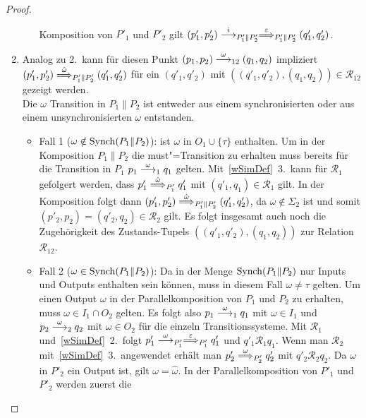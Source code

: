 \begin{proof}
\begin{enumerate}
\begin{itemize}
          Komposition von $P'_1$ und $P'_2$ gilt $(p'_1,p'_2)
          \must[i]_{P'_1\|P'_2} \weakmust[\varepsilon]_{P'_1\|P'_2}
          (q'_1,q'_2)$.
      \end{itemize}
    \item Analog zu 2.\ kann für diesen Punkt $(p_1,p_2) \must[\omega]_{12}
      (q_1,q_2)$ impliziert $(p'_1,p'_2) \weakmust[\hat{\omega}]_{P'_1\|P'_2}
      (q'_1,q'_2)$ für ein $(q'_1,q'_2)$ mit $((q'_1,q'_2),(q_1,q_2)) \in
      \mathcal{R}_{12}$ gezeigt werden.\\
      Die $\omega$ Transition in $P_1\|P_2$ ist entweder aus einem
      synchronisierten oder aus einem unsynchronisierten $\omega$ entstanden.
      \begin{itemize}
        \item Fall 1 ($\omega\notin\mathrm{Synch} (P_1\|P_2)$): \OBdA{} ist $\omega$ in
          $O_1\cup\{\tau\}$ enthalten. Um in der Komposition $P_1\|P_2$ die
          must"=Transition zu erhalten muss bereits für die Transition in $P_1$
          $p_1 \must[\omega]_1 q_1$ gelten. Mit~\ref{wSimDef}~3.\ kann für
          $\mathcal{R}_1$ gefolgert werden, dass $p'_1
          \weakmust[\hat{\omega}]_{P'_1} q'_1$ mit $(q'_1,q_1)\in\mathcal{R}_1$
          gilt. In der Komposition folgt dann $(p'_1,p'_2)
          \weakmust[\hat{\omega}]_{P'_1\|P'_2} (q'_1,q'_2)$, da $\omega\notin
          \Sigma _2$ ist und somit $(p'_2,p_2)=(q'_2,q_2)\in\mathcal{R}_2$
          gilt. Es folgt insgesamt auch noch die Zugehörigkeit des
          Zustands-Tupels $((q'_1,q'_2),(q_1,q_2))$ zur Relation
          $\mathcal{R}_{12}$.
        \item Fall 2 ($\omega\in\mathrm{Synch} (P_1\|P_2)$): Da in der Menge $\mathrm{Synch}
          (P_1\|P_2)$ nur Inputs und Outputs enthalten sein können, muss in
          diesem Fall $\omega\neq\tau$ gelten. Um einen Output $\omega$ in der
          Parallelkomposition von $P_1$ und $P_2$ zu erhalten, muss \oBdA{}
          $\omega\in I_1\cap O_2$ gelten. Es folgt also $p_1\must[\omega]_1
          q_1$ mit $\omega\in I_1$ und $p_2\must[\omega]_2 q_2$ mit $\omega\in
          O_2$ für die einzeln Transitionssysteme. Mit $\mathcal{R}_1$
          und~\ref{wSimDef}~2.\ folgt $p'_1\must[\omega]_{P'_1}
          \weakmust[\varepsilon]_{P'_1} q'_1$ und $q'_1\mathcal{R}_1 q_1$. Wenn
          man $\mathcal{R}_2$ mit~\ref{wSimDef}~3.\ angewendet erhält man $p'_2
          \weakmust[\omega]_{P'_2} q'_2$ mit $q'_2\mathcal{R}_2 q_2$. Da
          $\omega$ in $P'_2$ ein Output ist, gilt $\omega =\hat{\omega}$. In
          der Parallelkomposition von $P'_1$ und $P'_2$ werden zuerst die

\end{itemize}
\end{enumerate}
\end{proof}
